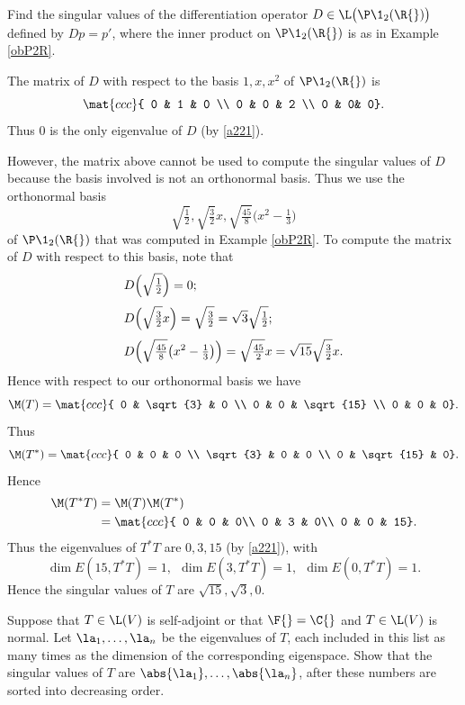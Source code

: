 \exercise
Find the singular values of the differentiation operator $D \in \L\bigl(\P\1_2(\R{})\bigr)$ defined by $Dp = p'\!$, where the inner product on $\P\1_2(\R{})$ is as in Example \ref{obP2R}.

\begin{Solution}
The matrix of $D$ with respect to the basis $1, x, x^2$ of $\P\1_2(\R{})$ is
\[
\mat{ccc}{
0 & 1 & 0 \\
0 & 0 & 2 \\
0 & 0& 0}.
\]
Thus $0$ is the only eigenvalue of $D$ (by \ref{a221}).

However, the matrix above cannot be used to compute the singular values of $D$ because the basis involved is not an orthonormal basis. Thus we use the orthonormal basis
\[
\sqrt{\tfrac{1}{2}}, \sqrt{\tfrac{3}{2}} x,
\sqrt{\tfrac{45}{8}} \bigl( x^2 - \tfrac{1}{3} \bigr)
\]
of $\P\1_2(\R{})$ that was computed in Example \ref{obP2R}. To compute the matrix of $D$ with respect to this basis, note that
\begin{align*}
&D\Bigl( \sqrt{\tfrac{1}{2}} \Bigr) = 0;\\[3bp]
&D\Bigl(\sqrt{\tfrac{3}{2}} x\Bigr) = \sqrt{\tfrac{3}{2}} = \sqrt{3} \sqrt{\tfrac{1}{2}} ;\\[3bp]
&D\Bigl( \sqrt{\tfrac{45}{8}} \bigl( x^2 - \tfrac{1}{3}\bigr) \Bigr) = \sqrt{ \tfrac{45}{2} } x = \sqrt{15} \sqrt{\tfrac{3}{2}} x.
\end{align*}
Hence with respect to our orthonormal basis we have
\[
\M(T) = \mat{ccc}{
0 & \sqrt{3} & 0 \\
0 & 0 & \sqrt{15} \\
0 & 0 & 0}.
\]
Thus
\[
\M(T^*) = \mat{ccc}{
0 & 0 & 0 \\
\sqrt{3} & 0 & 0 \\
0 & \sqrt{15} & 0}.
\]
Hence
\begin{align*}
\M(T^* T) &= \M(T) \M(T^*) \\
&= \mat{ccc}{
0 & 0 & 0\\
0 & 3 & 0\\
0 & 0 & 15}.
\end{align*}
Thus the eigenvalues of $T^* T$ are $0, 3, 15$ (by \ref{a221}), with
\[
\dim E(15, T^*T) = 1, \ \  \dim E(3, T^*T) = 1, \ \  \dim E(0, T^*T) = 1.
\]
Hence the singular values of $T$ are $\sqrt{15}, \sqrt{3}, 0$.
\end{Solution}

\exercise
Suppose that $T \in \L(V)$ is self-adjoint or that $\F{}= \C{}$ and $T \in \L(V)$ is normal. Let $\la_1, \ldots, \la_n$ be the eigenvalues of $T$, each included in this list as many times as the dimension of the corresponding eigenspace. Show that the singular values of $T$ are
$\abs{\la_1}, \ldots, \abs{\la_n}$, after these numbers are sorted into decreasing order.\label{7singsp}

